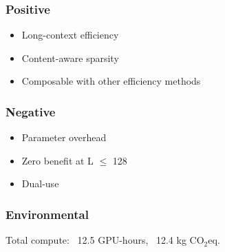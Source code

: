 \subsubsection{Positive}
\begin{itemize}
\item Long-context efficiency
\item Content-aware sparsity
\item Composable with other efficiency methods

\end{itemize}
\subsubsection{Negative}
\begin{itemize}
\item Parameter overhead
\item Zero benefit at L $\le$ 128
\item Dual-use

\end{itemize}
\subsubsection{Environmental}
Total compute: ~12.5 GPU-hours, ~12.4 kg CO$_2$eq.

